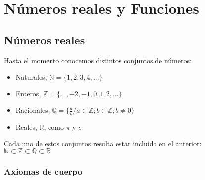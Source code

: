 \documentclass[Análisis.root.tex]{subfiles}
\begin{document}
    \section{Números reales y Funciones}
    \subsection{Números reales}
        Hasta el momento conocemos distintos conjuntos de números:
        \begin{itemize}
            \item Naturales, \(\mathbb{N} = \{1,2,3,4,...\}\)
            \item Enteros, \(\mathbb{Z} = \{...,-2,-1,0,1,2,...\}\)
            \item Racionales, \(\mathbb{Q} = \{\frac{a}{b} / a \in \mathbb{Z}; b \in \mathbb{Z};b \ne 0\}\)
            \item Reales, \(\mathbb{R}\), como \(\pi\) y \(e\)
        \end{itemize}
        Cada uno de estos conjuntos resulta estar incluido en el anterior:\\[2mm]
        \(\mathbb{N} \subset \mathbb{Z} \subset \mathbb{Q} \subset \mathbb{R}\)
        \begin{center}
        \end{center}
        \subsubsection{Axiomas de cuerpo}
\end{document}
